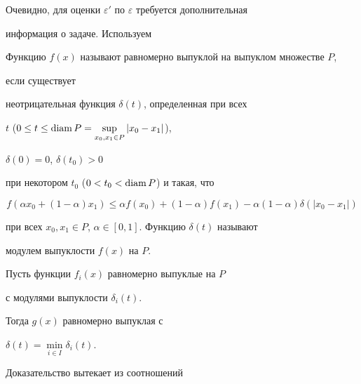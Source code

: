 Очевидно, для оценки $\varepsilon'$ по $\varepsilon$ требуется дополнительная


информация о задаче. Используем 





\begin{defn}


Функцию $f(x)$ называют равномерно выпуклой на выпуклом множестве $P$,


если существует 


неотрицательная функция $\delta(t)$, определенная при всех 


$t$ ($0\leq t\leq \operatorname{diam} P=\sup\limits_{x_0,x_1\in P}|x_0-x_1|$), 


$\delta(0)=0$, $\delta(t_0)>0$


при некотором $t_0$ ($0<t_0<\operatorname{diam} P$) и такая, что


$$


f(\alpha x_0+(1-\alpha)x_1)\leq\alpha f(x_0)+(1-\alpha)f(x_1)-


\alpha(1-\alpha)\delta(|x_0-x_1|)


$$


при всех $x_0,x_1\in P$, $\alpha\in[0,1]$. Функцию $\delta(t)$ называют


модулем выпуклости $f(x)$ на $P$.


\end{defn}





\begin{lem}\label{vip}


Пусть функции $f_i(x)$ равномерно выпуклые на $P$


с модулями выпуклости $\delta_i(t)$.


Тогда $g(x)$ равномерно выпуклая с


$\delta(t)=\min\limits_{i\in I}\delta_i(t)$.


\end{lem}





Доказательство вытекает из соотношений


